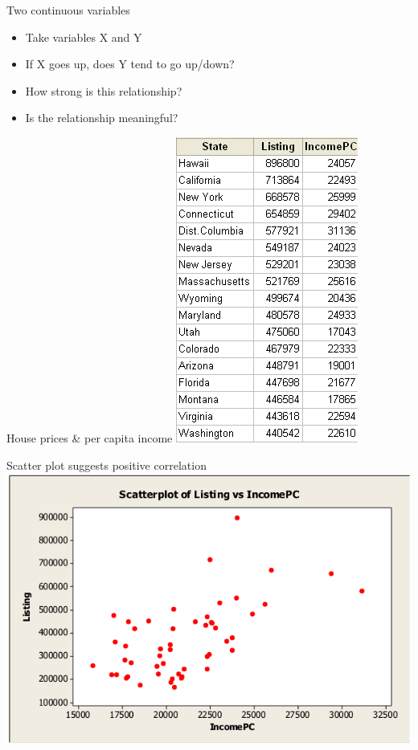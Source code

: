 \documentclass[aspectratio=169,usenames,dvipsnames]{beamer}
\begin{document}
\begin{frame}{Two continuous variables}
    \begin{itemize}
        \item Take variables X and Y
        \item If X goes up, does Y tend to go up/down?
        \item How strong is this relationship?
        \item Is the relationship meaningful?
    \end{itemize}
\end{frame}


\begin{frame}{House prices \& per capita income}
\includegraphics[height=0.85\textheight]{fig/housepricesincome}
\end{frame}

\begin{frame}{Scatter plot suggests positive correlation}
\includegraphics[height=0.7\textheight]{fig/incomelistingscatter}
\end{frame}
\end{document}
